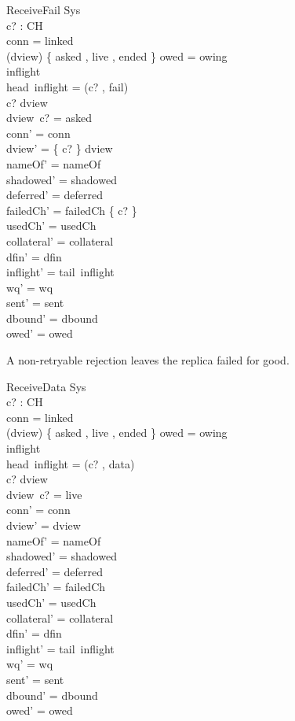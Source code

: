 \documentclass[a4paper,10pt,fleqn]{article}
\begin{document}
\begin{schema}{ReceiveFail}
  \Delta Sys \\
  c? : CH \\
\where
  conn = linked \\
  (\ran dview) \cap \{ asked , live , ended \} \neq \emptyset \lor owed = owing \\
  inflight \neq \langle \rangle \\
  head~inflight = (c? , fail) \\
  c? \in \dom dview \\
  dview~c? = asked \\
  conn' = conn \\
  dview' = \{ c? \} \ndres dview \\
  nameOf' = nameOf \\
  shadowed' = shadowed \\
  deferred' = deferred \\
  failedCh' = failedCh \cup \{ c? \} \\
  usedCh' = usedCh \\
  collateral' = collateral \\
  dfin' = dfin \\
  inflight' = tail~inflight \\
  wq' = wq \\
  sent' = sent \\
  dbound' = dbound \\
  owed' = owed
\end{schema}

A non-retryable rejection leaves the replica failed for good.

\begin{schema}{ReceiveData}
  \Delta Sys \\
  c? : CH \\
\where
  conn = linked \\
  (\ran dview) \cap \{ asked , live , ended \} \neq \emptyset \lor owed = owing \\
  inflight \neq \langle \rangle \\
  head~inflight = (c? , data) \\
  c? \in \dom dview \\
  dview~c? = live \\
  conn' = conn \\
  dview' = dview \\
  nameOf' = nameOf \\
  shadowed' = shadowed \\
  deferred' = deferred \\
  failedCh' = failedCh \\
  usedCh' = usedCh \\
  collateral' = collateral \\
  dfin' = dfin \\
  inflight' = tail~inflight \\
  wq' = wq \\
  sent' = sent \\
  dbound' = dbound \\
  owed' = owed
\end{schema}
\end{document}
